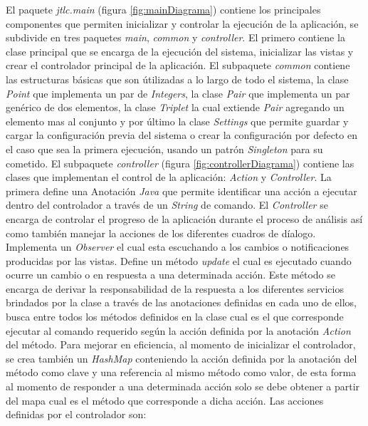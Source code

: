 El paquete \textit{jtlc.main} (figura \ref{fig:mainDiagrama}) contiene los principales componentes que permiten inicializar y controlar la ejecuci\'on de la aplicaci\'on, se subdivide en tres paquetes \textit{main}, \textit{common} y \textit{controller}. El primero contiene la clase principal que se encarga de la ejecuci\'on del sistema, inicializar las vistas y crear el controlador principal de la aplicaci\'on. El subpaquete \textit{common} contiene las estructuras b\'asicas que son \'utilizadas a lo largo de todo el sistema, la clase \textit{Point} que implementa un par de \textit{Integers}, la clase \textit{Pair} que implementa un par gen\'erico de dos elementos, la clase \textit{Triplet} la cual extiende \textit{Pair} agregando un elemento mas al conjunto y por \'ultimo la clase \textit{Settings} que permite guardar y cargar la configuraci\'on previa del sistema o crear la configuraci\'on por defecto en el caso que sea la primera ejecuci\'on, usando un patr\'on \textit{Singleton} para su cometido. El subpaquete \textit{controller} (figura \ref{fig:controllerDiagrama}) contiene las clases que implementan el control de la aplicaci\'on: \textit{Action} y \textit{Controller}. La primera define una Anotaci\'on \textit{Java} que permite identificar una acci\'on a ejecutar dentro del controlador a trav\'es de un \textit{String} de comando. El \textit{Controller} se encarga de controlar el progreso de la aplicaci\'on durante el proceso de an\'alisis as\'i como tambi\'en manejar la acciones de los diferentes cuadros de d\'ialogo. Implementa un \textit{Observer} el cual esta escuchando a los cambios o notificaciones producidas por las vistas. Define un m\'etodo \textit{update} el cual es ejecutado cuando ocurre un cambio o en respuesta a una determinada acci\'on. Este m\'etodo se encarga de derivar la responsabilidad de la respuesta a los diferentes servicios brindados por la clase a trav\'es de las anotaciones definidas en cada uno de ellos, busca entre todos los m\'etodos definidos en la clase cual es el que corresponde ejecutar al comando requerido seg\'un la acci\'on definida por la anotaci\'on \textit{Action} del m\'etodo. Para mejorar en eficiencia, al momento de inicializar el controlador, se crea tambi\'en un \textit{HashMap} conteniendo la acci\'on definida por la anotaci\'on del m\'etodo como clave y una referencia al mismo m\'etodo como valor, de esta forma al momento de responder a una determinada acci\'on solo se debe obtener a partir del mapa cual es el m\'etodo que corresponde a dicha acci\'on. Las acciones definidas por el controlador son:
